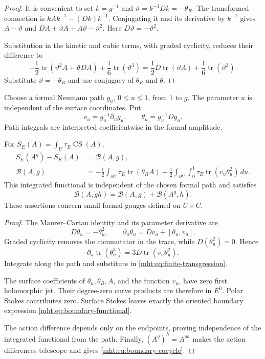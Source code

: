 \begin{proof}
It is convenient to set $k=g^{-1}$ and
$\vartheta=k^{-1}Dk=-\theta_R$.
The transformed connection is $kAk^{-1}-(Dk)k^{-1}$.
Conjugating it and its derivative by $k^{-1}$ gives
$A-\vartheta$ and
$DA+\vartheta A+A\vartheta-\vartheta^2$.
Here $D\vartheta=-\vartheta^2$.

Substitution in the kinetic and cubic terms, with graded cyclicity,
reduces their difference to
\[
 -\frac12\operatorname{tr}
       (\vartheta^2A+\vartheta DA)
       +\frac16\operatorname{tr}(\vartheta^3)
 =\frac12D\operatorname{tr}(\vartheta A)
       +\frac16\operatorname{tr}(\vartheta^3).
\]
Substitute $\vartheta=-\theta_R$ and use conjugacy of
$\theta_R$ and $\theta$.
\end{proof}

Choose a formal Neumann path $g_u$, $0\leq u\leq1$, from $1$ to $g$.
The parameter $u$ is independent of the surface coordinates.
Put
\[
 v_u=g_u^{-1}\partial_ug_u,\qquad \theta_u=g_u^{-1}Dg_u.
\]
Path integrals are interpreted coefficientwise in the formal
amplitude.

\begin{proposition}\label{mht:prop:surface-boundary-functional}
For $S_E(A)=\int_U\tau_E\operatorname{CS}(A)$,
\begin{align}
 S_E(A^g)-S_E(A)&=\mathcal B(A,g),\label{mht:eq:boundary-difference}\\
 \mathcal B(A,g)
 &=-\frac12\int_{\partial U}\tau_E\operatorname{tr}(\theta_RA)
   -\frac12\int_{\partial U}\int_0^1
               \tau_E\operatorname{tr}(v_u\theta_u^2)\,du.
       \label{mht:eq:boundary-functional}
\end{align}
This integrated functional is independent of the chosen formal path
and satisfies
\begin{equation}\label{mht:eq:boundary-cocycle}
 \mathcal B(A,gh)=\mathcal B(A,g)+\mathcal B(A^g,h).
\end{equation}
These assertions concern small formal gauges defined on $U\times C$.
\end{proposition}

\begin{proof}
The Maurer--Cartan identity and its parameter derivative are
\[
 D\theta_u=-\theta_u^2,\qquad
 \partial_u\theta_u=Dv_u+[\theta_u,v_u].
\]
Graded cyclicity removes the commutator in the trace, while
$D(\theta_u^2)=0$. Hence
\[
 \partial_u\operatorname{tr}(\theta_u^3)
             =3D\operatorname{tr}(v_u\theta_u^2).
\]
Integrate along the path and substitute in
\eqref{mht:eq:finite-transgression}.

The surface coefficients of $\theta_u,\theta_R,A$, and the function
$v_u$, have zero first holomorphic jet. Their degree-zero curve products
are therefore in $E^0$. Polar Stokes contributes zero.
Surface Stokes leaves exactly the oriented boundary expression
\eqref{mht:eq:boundary-functional}.

The action difference depends only on the endpoints, proving
independence of the integrated functional from the path.
Finally, $(A^g)^h=A^{gh}$ makes the action differences telescope and
gives \eqref{mht:eq:boundary-cocycle}.
\end{proof}

